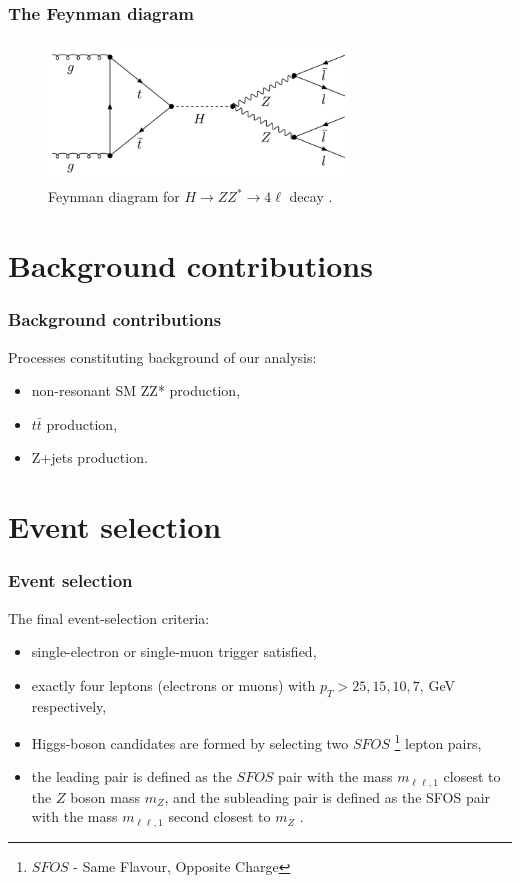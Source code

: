\documentclass[aspectratio=1610, english]{beamer}
\newcommand{\hzz}{ H\rightarrow ZZ^{*}\rightarrow 4 \ell}
\begin{document}
\begin{frame}
\frametitle{The Feynman diagram}

\begin{figure} [H]
\centering
\includegraphics[width=8cm]{feynman_diagram.png}
\caption{Feynman diagram for $\hzz$ decay \cite{diagram}. }
\end{figure}

\end{frame}

\section{Background contributions}
\begin{frame}
\frametitle{Background contributions}
Processes constituting background of our analysis:
\begin{itemize}
\item non-resonant SM ZZ* production,
\item $t\bar{t}$ production,
\item Z+jets production.
\end{itemize}

\end{frame}

\section{Event selection}

\begin{frame}
\frametitle{Event selection}
The final event-selection criteria:

\begin{itemize}
\item single-electron or single-muon trigger satisfied,
\item exactly four leptons (electrons or muons) with $p_T>25, 15, 10, 7$, GeV respectively,
\item Higgs-boson candidates are formed by selecting two $SFOS$ \footnote{$SFOS$ - Same Flavour, Opposite Charge} lepton pairs,
\item the leading pair is defined as the $SFOS$  pair with the mass $m_{\ell \ell, 1}$ closest to the $Z$ boson mass $m_Z$, and the subleading pair is defined as the SFOS pair with the mass $m_{\ell \ell, 1}$ second closest to $m_Z$ \cite{opendata}.

\end{itemize}

\end{frame}
\end{document}
